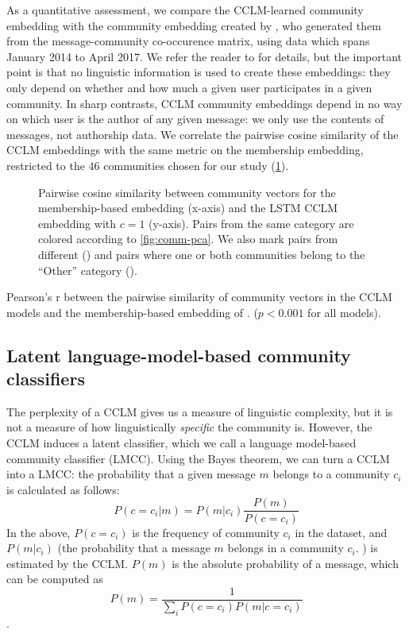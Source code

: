 \documentclass[11pt,a4paper]{article}
\newcommand\jp[1]{\todo[backgroundcolor=blue!10]{JP: #1}}
\begin{document}
As a quantitative assessment, we compare the CCLM-learned community
embedding with the community embedding created by \citet{Kumar2018},
who generated them from the message-community co-occurence matrix,
using data which spans January 2014 to April 2017. We refer the reader
to \citet{Kumar2018}\jp{I actually cannot find in their paper what
  they do.} for details, but the important point is that no linguistic
information is used to create these embeddings: they only depend on
whether and how much a given user participates in a given
community. In sharp contrasts, CCLM community embeddings depend in no
way on which user is the author of any given message: we only use the
contents of messages, not authorship data. 
%
We correlate the pairwise cosine similarity of the
CCLM embeddings with the same metric on the membership embedding,
restricted to the 46 communities chosen for our study
(\cref{fig:pairwise-comm-sim}).

\begin{figure}
  \caption{Pairwise cosine similarity between community vectors for 
    the membership-based embedding (x-axis) and
  the LSTM CCLM embedding with $c=1$ (y-axis). 
  Pairs from the same category are colored according to \cref{fig:comm-pca}.
  We also mark pairs from different (\texttimes) and pairs where one or both
  communities belong to the ``Other'' category (\textbigcircle).
  }
  \label{fig:pairwise-comm-sim}
\end{figure}

\begin{table}
  \centering
  
  \caption{Pearson's r between the pairwise similarity of community vectors
  in the CCLM models and the membership-based embedding of \citet{Kumar2018}.
  ($p<0.001$ for all models).
  }
  \label{tab:pairwise-comm-sim}
\end{table}

\subsection{Latent language-model-based community classifiers}

The perplexity of a CCLM gives us a measure of linguistic complexity,
but it is not a measure of how linguistically \emph{specific} the
community is. However, the CCLM induces a latent classifier,
which we call a language model-based community classifier
(LMCC). Using the Bayes theorem, we can turn a
CCLM into a LMCC: the probability that a given message $m$
belongs to a community $c_i$ is calculated as follows:
\[P(c=c_i | m) = P(m | c_i)\frac {P(m)} {P(c=c_i)}\]
In the above,
$P(c=c_i)$ is the frequency of community $c_i$ in the dataset, and
$P(m | c_i)$ (the probability that a message $m$
belongs in a community $c_i$. ) is estimated by the CCLM. $P(m)$ is the absolute
probability of a message, which can be computed as
\[P(m) = \frac 1 {\sum_i P(c=c_i) P(m|c=c_i ) }\].
\end{document}
